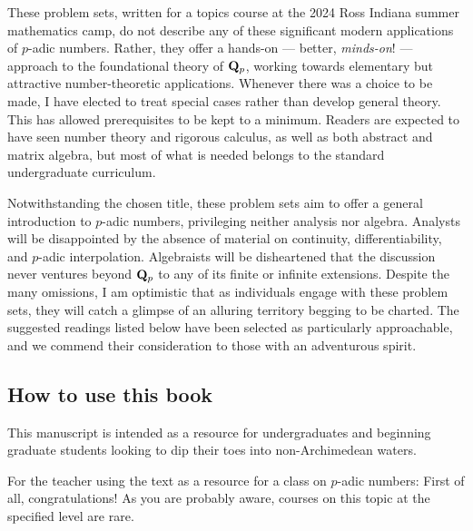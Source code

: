 These problem sets, written for a topics course at the 2024 Ross Indiana summer mathematics camp, do not describe any of these significant modern applications of $p$-adic numbers. Rather, they offer a hands-on --- better, \emph{minds-on}! --- approach to the foundational theory of $\mathbf{Q}_p$, working towards elementary but attractive number-theoretic applications. Whenever there was a choice to be made, I have elected to treat special cases rather than develop general theory. This has allowed prerequisites to be kept to a minimum. Readers are expected to have seen number theory and rigorous calculus, as well as both abstract and matrix algebra, but most of what is needed belongs to the standard undergraduate curriculum.

Notwithstanding the chosen title, these problem sets aim to offer a general introduction to $p$-adic numbers, privileging neither analysis nor algebra. Analysts will be disappointed by the absence of material on continuity, differentiability, and $p$-adic interpolation. Algebraists will be disheartened that the discussion never ventures beyond $\mathbf{Q}_p$ to any of its finite or infinite extensions. Despite the many omissions, I am optimistic that as individuals engage with these problem sets, they will catch a glimpse of an alluring territory begging to be charted. The suggested readings listed below have been selected as particularly approachable, and we commend their consideration to those with an adventurous spirit.




\subsection*{How to use this book}

This manuscript is intended as a resource for undergraduates and beginning graduate students looking to dip their toes into non-Archimedean waters.

For the teacher using the text as a resource for a class on $p$-adic numbers: First of all, congratulations! As you are probably aware, courses on this topic at the specified level are rare. 

